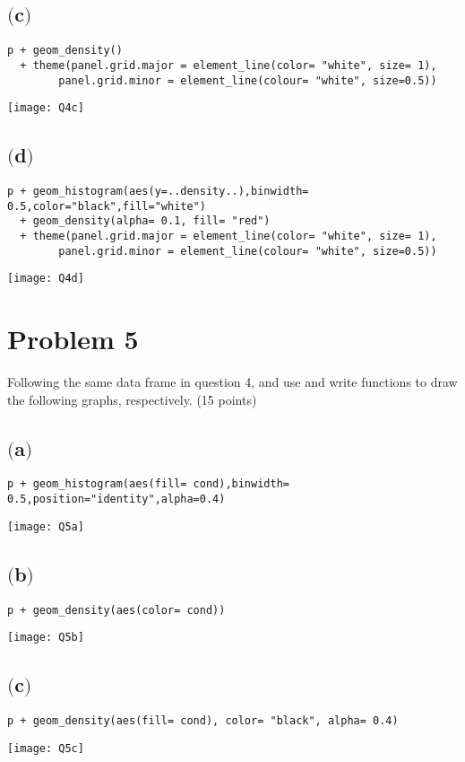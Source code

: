 \documentclass[a4paper,man,natbib]{apa6}
\begin{document}
\subsection{$($c$)$}
\begin{verbatim}
p + geom_density() 
  + theme(panel.grid.major = element_line(color= "white", size= 1), 
  		panel.grid.minor = element_line(colour= "white", size=0.5))
\end{verbatim}
\texttt{[image: Q4c]}

\subsection{$($d$)$}
\begin{verbatim}
p + geom_histogram(aes(y=..density..),binwidth= 0.5,color="black",fill="white") 
  + geom_density(alpha= 0.1, fill= "red") 
  + theme(panel.grid.major = element_line(color= "white", size= 1), 
  		panel.grid.minor = element_line(colour= "white", size=0.5))
\end{verbatim}
\texttt{[image: Q4d]}

\pagebreak
\section{Problem 5}
Following the same data frame in question 4, and use and write functions to draw the following graphs, respectively. (15 points) \\

\subsection{$($a$)$}
\begin{verbatim}
p + geom_histogram(aes(fill= cond),binwidth= 0.5,position="identity",alpha=0.4)
\end{verbatim}
\texttt{[image: Q5a]}

\subsection{$($b$)$}
\begin{verbatim}
p + geom_density(aes(color= cond))
\end{verbatim}
\texttt{[image: Q5b]}

\subsection{$($c$)$}
\begin{verbatim}
p + geom_density(aes(fill= cond), color= "black", alpha= 0.4)
\end{verbatim}
\texttt{[image: Q5c]}
\end{document}
